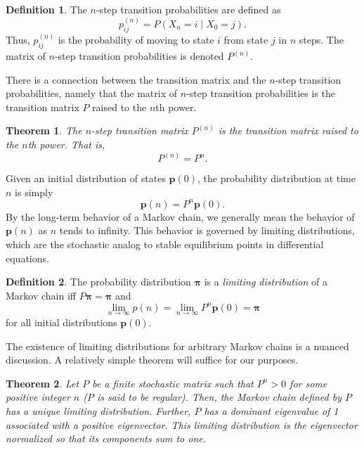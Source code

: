 \documentclass[12pt]{article}
\renewcommand{\vec}[1]{\boldsymbol{\mathbf{#1}}}
\newtheorem{thm}{Theorem}
\theoremstyle{definition}
\newtheorem{defn}{Definition}
\begin{document}
\begin{defn}
    \label{defn:n-step}
    The $n$-step transition probabilities are defined as $$p^{(n)}_{ij} = P(X_n
    = i \mid X_0 = j).$$ Thus, $p^{(n)}_{ij}$ is the probability of moving to
    state $i$ from state $j$ in $n$ steps. The matrix of $n$-step transition
    probabilities is denoted $P^{(n)}$.
\end{defn}

There is a connection between the transition matrix and the $n$-step transition
probabilities, namely that the matrix of $n$-step transition probabilities is
the transition matrix $P$ raised to the $n$th power.

\begin{thm}
    \label{thm:n-step-power}
    The $n$-step transition matrix $P^{(n)}$ is the transition matrix raised to
    the $n$th power. That is, $$P^{(n)} = P^n.$$
\end{thm}

Given an initial distribution of states $\vec{p}(0)$, the probability
distribution at time $n$ is simply $$\vec{p}(n) = P^n \vec{p}(0).$$ By the
long-term behavior of a Markov chain, we generally mean the behavior of
$\vec{p}(n)$ as $n$ tends to infinity. This behavior is governed by limiting
distributions, which are the stochastic analog to stable equilibrium points in
differential equations.

\begin{defn}
    \label{defn:limiting-dist}
    The probability distribution $\vec{\pi}$ is a \emph{limiting distribution}
    of a Markov chain iff $P \vec{\pi} = \vec{\pi}$ and $$\lim_{n \to \infty}
    p(n) = \lim_{n \to \infty} P^n \vec{p}(0) = \vec{\pi}$$ for all initial
    distributions $\vec{p}(0)$.
\end{defn}

The existence of limiting distributions for arbitrary Markov chains is a
nuanced discussion. A relatively simple theorem will suffice for our purposes.

\begin{thm}
    \label{thm:regular-limiting-dist}
    Let $P$ be a finite stochastic matrix such that $P^n > 0$ for some positive
    integer $n$ ($P$ is said to be regular). Then, the Markov chain defined by
    $P$ has a unique limiting distribution. Further, $P$ has a dominant
    eigenvalue of 1 associated with a positive eigenvector. This limiting
    distribution is the eigenvector normalized so that its components sum to
    one.
\end{thm}
\end{document}
